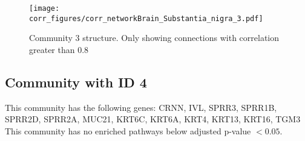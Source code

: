 \begin{figure}[h!]
\centering
\texttt{[image: corr\_figures/corr\_networkBrain\_Substantia\_nigra\_3.pdf]}
\caption{Community 3 structure. Only showing connections with correlation greater than 0.8}
\end{figure}




\subsection*{Community with ID 4}
This community has the following genes: CRNN, IVL, SPRR3, SPRR1B, SPRR2D, SPRR2A, MUC21, KRT6C, KRT6A, KRT4, KRT13, KRT16, TGM3
\\
This community has no enriched pathways below adjusted p-value $< 0.05$.

